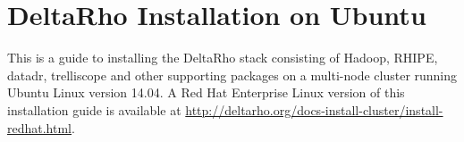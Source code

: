 \section{DeltaRho Installation on Ubuntu}

This is a guide to installing the DeltaRho stack consisting of
Hadoop, RHIPE, datadr, trelliscope and other supporting packages on
a multi-node cluster running Ubuntu Linux version 14.04.  A Red Hat
Enterprise Linux version of this installation guide is available at
\url{http://deltarho.org/docs-install-cluster/install-redhat.html}.
